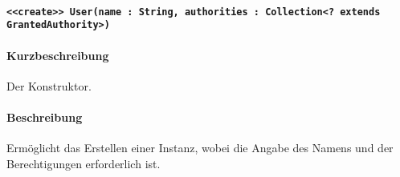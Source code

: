 \paragraph*{\texttt{<<create>> User(name : String, authorities : Collection<? extends GrantedAuthority>)}}%
\paragraph*{Kurzbeschreibung}
Der Konstruktor.
\paragraph*{Beschreibung}
Ermöglicht das Erstellen einer Instanz, wobei die Angabe des Namens und der Berechtigungen erforderlich ist.
